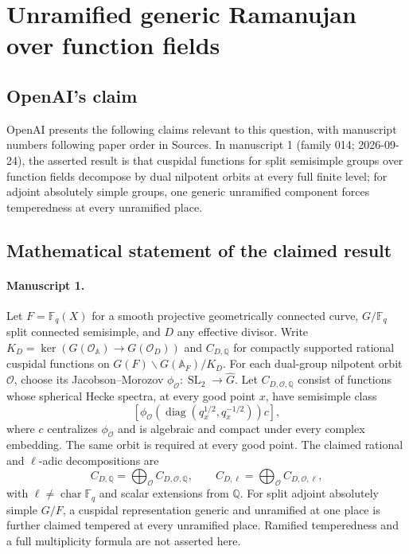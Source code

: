 \documentclass[11pt]{article}
\begin{document}
\section*{Unramified generic Ramanujan over function fields}

\subsection{OpenAI's claim}
OpenAI presents the following claims relevant to this question, with manuscript numbers following paper order in Sources. In manuscript 1 (family 014; 2026-09-24), the asserted result is that cuspidal functions for split semisimple groups over function fields decompose by dual nilpotent orbits at every full finite level; for adjoint absolutely simple groups, one generic unramified component forces temperedness at every unramified place.

\subsection{Mathematical statement of the claimed result}
\paragraph{Manuscript 1.}
Let $F=\mathbb F_q(X)$ for a smooth projective geometrically connected curve, $G/\mathbb F_q$ split connected semisimple, and $D$ any effective divisor. Write $K_D=\ker(G(\mathcal O_{\mathbb A})\to G(\mathcal O_D))$ and $C_{D,\mathbb Q}$ for compactly supported rational cuspidal functions on $G(F)\backslash G(\mathbb A_F)/K_D$. For each dual-group nilpotent orbit $\mathcal O$, choose its Jacobson--Morozov $\phi_{\mathcal O}:\operatorname{SL}_2\to\widehat G$. Let $C_{D,\mathcal O,\mathbb Q}$ consist of functions whose spherical Hecke spectra, at every good point $x$, have semisimple class
\[
 [\phi_{\mathcal O}(\operatorname{diag}(q_x^{1/2},q_x^{-1/2}))c],
\]
where $c$ centralizes $\phi_{\mathcal O}$ and is algebraic and compact under every complex embedding. The same orbit is required at every good point. The claimed rational and $\ell$-adic decompositions are
\[
 C_{D,\mathbb Q}=\bigoplus_{\mathcal O} C_{D,\mathcal O,\mathbb Q},\qquad
 C_{D,\ell}=\bigoplus_{\mathcal O} C_{D,\mathcal O,\ell},
\]
with $\ell\ne\operatorname{char}\mathbb F_q$ and scalar extensions from $\mathbb Q$. For split adjoint absolutely simple $G/F$, a cuspidal representation generic and unramified at one place is further claimed tempered at every unramified place. Ramified temperedness and a full multiplicity formula are not asserted here.
\end{document}
